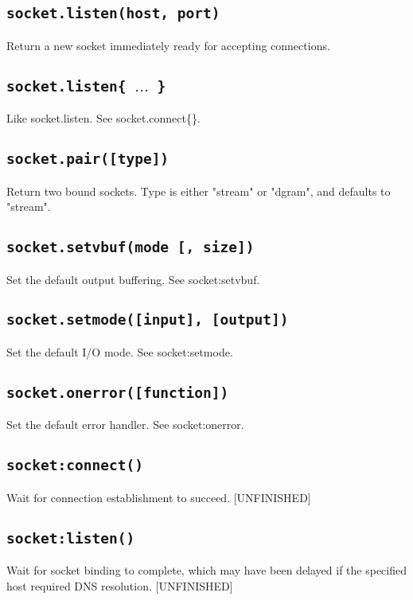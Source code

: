\documentclass[11pt, oneside]{memoir}
\newcommand*{\fn}[1]{\texttt{#1}\xspace}
\begin{document}
\subsection[\fn{socket.listen}]{\fn{socket.listen(host, port)}}
	Return a new socket immediately ready for accepting connections.

\subsection[\fn{socket.listen}]{\fn{socket.listen\{ $\ldots$ \}}}
	Like socket.listen. See socket.connect\{\}.

\subsection[\fn{socket.pair}]{\fn{socket.pair([type])}}
	Return two bound sockets. Type is either "stream" or "dgram", and
	defaults to "stream".

\subsection[\fn{socket.setvbuf}]{\fn{socket.setvbuf(mode [, size])}}
	Set the default output buffering. See socket:setvbuf.

\subsection[\fn{socket.setmode}]{\fn{socket.setmode([input], [output])}}
	Set the default I/O mode. See socket:setmode.

\subsection[\fn{socket.onerror}]{\fn{socket.onerror([function])}}
	Set the default error handler. See socket:onerror.

\subsection[\fn{socket:connect}]{\fn{socket:connect()}}
	Wait for connection establishment to succeed. [UNFINISHED]

\subsection[\fn{socket:listen}]{\fn{socket:listen()}}
	Wait for socket binding to complete, which may have been delayed if
	the specified host required DNS resolution. [UNFINISHED]
\end{document}
